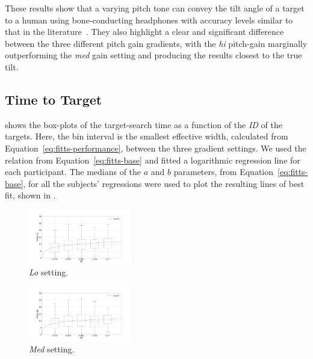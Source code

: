 \documentclass[sigconf, review=true, screen=true, anonymous=true]{acmart}
\begin{document}
These results show that a varying pitch tone can convey the tilt angle of a target to a human using bone-conducting headphones with accuracy levels similar to that in the literature~\cite{bujacz2011sonification, katz2011spatial, zotkin2004rendering}. They also highlight a clear and significant difference between the three different pitch gain gradients, with the \emph{hi} pitch-gain marginally outperforming the \emph{med} gain setting and producing the results closest to the true tilt. 

\subsection{Time to Target}

 shows the box-plots of the target-search time as a function of the \emph{ID} of the targets.
Here, the bin interval is the smallest effective width, calculated from Equation~\ref{eq:fitts-performance}, between the three gradient settings.
We used the relation from Equation~\ref{eq:fitts-base} and fitted a logarithmic regression line for each participant.
The medians of the $a$ and $b$ parameters, from Equation~\ref{eq:fitts-base}, for all the subjects' regressions were used to plot the resulting lines of best fit, shown in . 

\begin{figure}
  \centering
  \includegraphics[clip, trim=120 20 120 20, width=0.4\textwidth]{figures/fitts_lo.png}
  \caption{\emph{Lo} setting. }
  \label{fig:fitts-lo}
\end{figure}
\begin{figure}
  \centering
  \includegraphics[clip, trim=120 20 120 20, width=0.4\textwidth]{figures/fitts_med.png}
  \caption{\emph{Med} setting. }
  \label{fig:fitts-med}
\end{figure}
\end{document}
